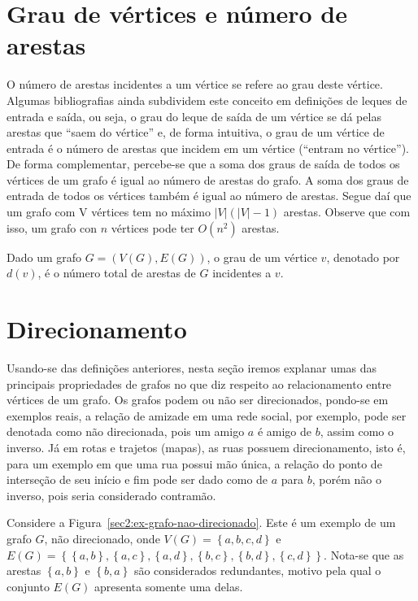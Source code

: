 \section{Grau de vértices e número de arestas}
O número de arestas incidentes a um vértice se refere ao grau deste vértice. Algumas bibliografias ainda subdividem este conceito em definições de leques de entrada e saída, ou seja, o grau do leque de saída de um vértice se dá pelas arestas que ``saem do vértice'' e, de forma intuitiva, o grau de um vértice de entrada é o número de arestas que incidem em um vértice (``entram no vértice''). De forma complementar, percebe-se que a soma dos graus de saída de todos os vértices de um grafo é igual ao número de arestas do grafo. A soma dos graus de entrada de todos os vértices também é igual ao número de arestas. Segue daí que um grafo com V vértices tem no máximo $|V|(|V| - 1)$ arestas. Observe que com isso, um grafo con $n$ vértices pode ter $O(n^2)$ arestas.

\begin{definition}
    Dado um grafo $G = (V(G), E(G))$, o grau de um vértice $v$, denotado por $d(v)$, é o número total de arestas de $G$ incidentes a $v$.
\end{definition}

\section{Direcionamento}
Usando-se das definições anteriores, nesta seção iremos explanar umas das principais propriedades de grafos no que diz respeito ao relacionamento entre vértices de um grafo. Os grafos podem ou não ser direcionados, pondo-se em exemplos reais, a relação de amizade em uma rede social, por exemplo, pode ser denotada como não direcionada, pois um amigo $a$ é amigo de $b$, assim como o inverso. Já em rotas e trajetos (mapas), as ruas possuem direcionamento, isto é, para um exemplo em que uma rua possui mão única, a relação do ponto de interseção de seu início e fim pode ser dado como de $a$ para $b$, porém não o inverso, pois seria considerado contramão.

Considere a Figura~\ref{sec2:ex-grafo-nao-direcionado}. Este é um exemplo de um grafo $G$, não direcionado, onde $V(G) = \left\{a, b, c, d\right\} $ e $E(G) = \left\{\left\{a, b\right\}, \left\{a, c\right\}, \left\{a, d\right\}, \left\{b, c\right\}, \left\{b, d\right\}, \left\{c, d\right\}\right\}$. Nota-se que as arestas $\left\{a, b\right\} $ e $\left\{b, a\right\} $ são considerados redundantes, motivo pela qual o conjunto $E(G)$ apresenta somente uma delas.

